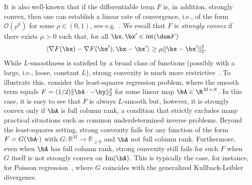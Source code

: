 \documentclass[11pt]{amsart}
\newcommand{\es}[1]{{\color{blue}#1}}
\newcommand{\jc}[1]{{\color{red}#1}}
\begin{document}
It is also well-known that if the differentiable term $F$ is, in addition, strongly convex, then one can establish a linear rate of convergence, i.e., of the form $\mathcal{O}(\rho^k)$ for some $\rho\in(0,1)$, see e.g.~\cite{Bredies_2008,Nesterov2013}. We recall that $F$ is \emph{strongly convex} if there exists $\mu>0$ such that, for all $\bx, \bx' \in \mathrm{int}(\dom F)$
\begin{equation}\label{eq:strong_conv_intro}
\langle \nabla F(\bx)-\nabla F(\bx'), \bx-\bx'\rangle\geq\mu\|\bx-\bx'\|_2^2.
\end{equation}
 While $L$-smoothness is satisfied by a broad class of functions (possibly with a large, i.e., loose, constant $L$), strong convexity is much more restrictive~\cite{Li2017}. To illustrate this, consider the least-squares regression problem, where the smooth term equals $F=(1/2)\|\bA\cdot-\by\|_2^2$ for some linear map $\bA\in\R^{M\times N}$.
In this case, it is easy to see that $F$ is always $L$-smooth but, however, it is strongly convex only if $\bA$ is full column rank, a condition that strictly excludes many practical situations such as common underdetermined inverse problems. Beyond the least-squares setting, strong convexity fails for any function of the form $F = G(\bA \cdot)$ with $G\colon \mathbb{R}^M \to \mathbb{R}_{\geq 0}$ and $\bA$  not full column rank. Furthermore, even when $\bA$ has full column rank, strong convexity still fails for such $F$ when $G$ itself is not strongly convex on $\mathrm{Im}(\bA)$. This is typically the case, for instance, for Poisson regression~\cite{harmany2011spiral}, where $G$ coincides with the generalized Kullback-Leibler divergence.
\end{document}
